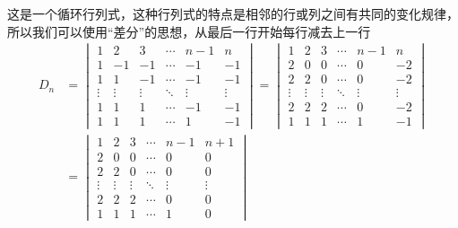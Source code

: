 \begin{solution}
    这是一个循环行列式，这种行列式的特点是相邻的行或列之间有共同的变化规律，所以我们可以使用“差分”的思想，从最后一行开始每行减去上一行
    \begin{align*}
        D_n & =\begin{vmatrix}
                   1      & 2      & 3      & \cdots & n-1    & n      \\
                   1      & -1     & -1     & \cdots & -1     & -1     \\
                   1      & 1      & -1     & \cdots & -1     & -1     \\
                   \vdots & \vdots & \vdots & \ddots & \vdots & \vdots \\
                   1      & 1      & 1      & \cdots & -1     & -1     \\
                   1      & 1      & 1      & \cdots & 1      & -1
               \end{vmatrix}=\begin{vmatrix}
                                 1      & 2      & 3      & \cdots & n-1    & n      \\
                                 2      & 0      & 0      & \cdots & 0      & -2     \\
                                 2      & 2      & 0      & \cdots & 0      & -2     \\
                                 \vdots & \vdots & \vdots & \ddots & \vdots & \vdots \\
                                 2      & 2      & 2      & \cdots & 0      & -2     \\
                                 1      & 1      & 1      & \cdots & 1      & -1
                             \end{vmatrix} \\
            & =\begin{vmatrix}
                   1      & 2      & 3      & \cdots & n-1    & n+1    \\
                   2      & 0      & 0      & \cdots & 0      & 0      \\
                   2      & 2      & 0      & \cdots & 0      & 0      \\
                   \vdots & \vdots & \vdots & \ddots & \vdots & \vdots \\
                   2      & 2      & 2      & \cdots & 0      & 0      \\
                   1      & 1      & 1      & \cdots & 1      & 0

\end{vmatrix}
\end{align*}
\end{solution}
